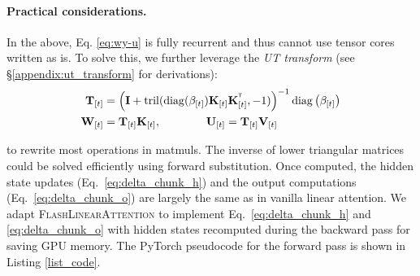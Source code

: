 \paragraph{Practical considerations.} 
In the above, Eq. \ref{eq:wy-u} is fully recurrent and thus
cannot use tensor cores written as is.
To solve this, we further leverage the \emph{UT transform} \cite{Joffrain2006AccumulatingHT, TomsDominguez2018FastBO} (see \S\ref{appendix:ut_transform} for derivations): 
\begin{align}
   \rmT_{[t]} &= \left(\rmI + \operatorname{tril}(\operatorname{diag}(\beta_{[t]})\rmK_{[t]} \rmK_{[t]}^\intercal,-1)\right)^{-1}\operatorname{diag}\left(\beta_{[t]}\right) \label{eq:inverse} \\  \rmW_{[t]} &= \rmT_{[t]} \rmK_{[t]}, \qquad \qquad
\rmU_{[t]}=\rmT_{[t]}\rmV_{[t]}  \label{eq:wu=akv}
\end{align}

to rewrite most operations in matmuls. The  inverse of lower triangular matrices could be solved efficiently using forward substitution. Once computed,
the hidden state updates (Eq.~\ref{eq:delta_chunk_h}) and the output computations (Eq.~\ref{eq:delta_chunk_o}) are largely the same as in vanilla linear attention. We  adapt \textsc{FlashLinearAttention}  \cite{yang_gated_2023} to implement Eq.~\ref{eq:delta_chunk_h} and \ref{eq:delta_chunk_o} with hidden states recomputed during the backward pass for saving GPU memory. The PyTorch pseudocode for the forward pass is shown in Listing \ref{list_code}.


\vspace{-2mm}
